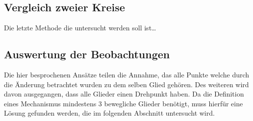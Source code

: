 \subsection{Vergleich zweier Kreise}

Die letzte Methode die untersucht werden soll ist\dots

\subsection{Auswertung der Beobachtungen}


Die hier besprochenen Ansätze teilen die Annahme, das alle Punkte welche durch die Änderung betrachtet wurden zu dem selben Glied gehören.
Des weiteren wird davon ausgegangen, dass alle Glieder einen Drehpunkt haben.
Da die Definition eines Mechanismus mindestens 3 bewegliche Glieder benötigt, muss hierfür eine Lösung gefunden werden, die im folgenden Abschnitt untersucht wird.

